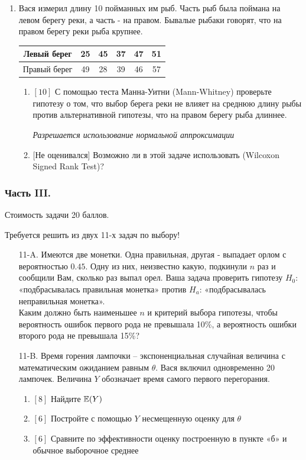 \documentclass[12pt, a4paper]{article}\usepackage[]{graphicx}\usepackage[]{color}
\begin{document}
\begin{enumerate}
\item Вася измерил длину 10 пойманных им рыб. Часть рыб была поймана на
левом берегу реки, а часть - на правом. Бывалые рыбаки говорят,
что на правом берегу реки рыба крупнее.

\begin{tabular}{|c|c|c|c|c|c|}
  \hline
  Левый берег & 25 & 45 & 37 & 47 & 51   \\
  \hline
  Правый берег & 49 & 28 & 39 & 46 & 57   \\
  \hline
\end{tabular}
\begin{enumerate}
\item{} $[10]$ С помощью теста Манна-Уитни (Mann-Whitney) проверьте
гипотезу о том, что выбор берега реки не влияет на среднюю длину
рыбы против
альтернативной гипотезы, что на правом берегу рыба длиннее.

\emph{Разрешается использование нормальной аппроксимации}
\item{} $[$Не оценивался$]$ Возможно ли в этой задаче использовать
(Wilcoxon Signed Rank Test)?
\end{enumerate}
\end{enumerate}

\subsubsection*{Часть III.}

Стоимость задачи 20 баллов.

Требуется решить \textbf{} из двух 11-х задач по
выбору!

\begin{enumerate}
\item[11-A.] Имеются две монетки. Одна правильная, другая - выпадает орлом с
вероятностью $0.45$. Одну из них, неизвестно какую, подкинули $n$
раз и сообщили Вам, сколько раз выпал орел. Ваша задача проверить
гипотезу $H_{0}$: «подбрасывалась правильная монетка» против
$H_{a}$:
«подбрасывалась неправильная монетка». \\
Каким должно быть наименьшее $n$ и критерий выбора гипотезы, чтобы
вероятность ошибок первого рода не превышала 10\%, а вероятность
ошибки второго рода не превышала 15\%?

\item[11-B.] Время горения лампочки – экспоненциальная случайная величина с
математическим ожиданием равным $\theta $. Вася включил
одновременно 20 лампочек. Величина  $Y$ обозначает время самого
первого перегорания.
\begin{enumerate}
\item{} $[8]$ Найдите $\mathbb{E}(Y)$
\item{} $[6]$ Постройте с помощью  $Y$ несмещенную оценку для  $\theta$
\item{} $[6]$ Сравните по эффективности оценку построенную в пункте
«б» и
обычное выборочное среднее
\end{enumerate}
\end{enumerate}
\end{document}
